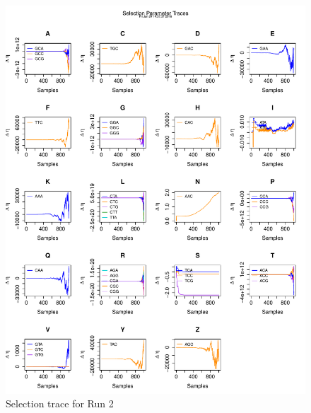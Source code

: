 \documentclass[11pt]{labbook}
\begin{document}
\begin{itemize}
\begin{figure}
        \includegraphics[scale=.65]{FONSE_Plots/2016/June_24/Run2_SelectionTrace}
        \caption{Selection trace for Run 2}
        \label{fig:JUN24_SEL_R2}
    \end{figure}
        

\end{itemize}
\end{document}
